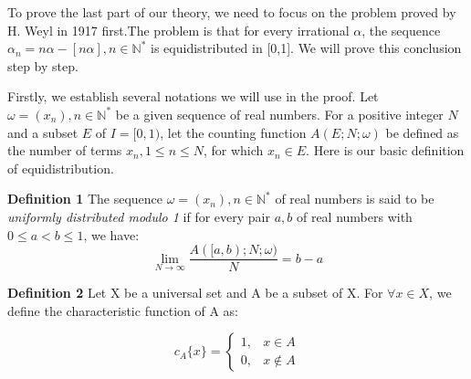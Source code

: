 \documentclass[12pt]{article}
\begin{document}
\par To prove the last part of our theory, we need to focus on the problem proved by H. Weyl in 1917 first.The problem is that for every irrational 
$\alpha$, the sequence $\alpha _n=n\alpha-[n\alpha], n\in \mathbb{N^*}$ is equidistributed in [0,1]. We will prove this conclusion step by step.
\par Firstly, we establish several notations we will use in the proof. Let $\omega=(x_n), n\in \mathbb{N^*}$ be a given sequence of real numbers. For a positive integer $N$ and a subset $E$ of $I=[0,1)$, let the counting function $A(E;N;\omega)$ be defined as the number of terms $x_n,1\le n\le N$, for which ${x_n}\in E$. Here is our basic definition of equidistribution.
\par {\textbf{Definition 1}} The sequence $\omega=(x_n), n\in \mathbb{N^*}$ of real numbers is said to be \emph{uniformly distributed modulo 1} if for every pair $a,b$ of real numbers with $0\le a<b\le 1$, we have:
\begin{equation*}
\lim_{N\to \infty}\frac{A([a,b);N;\omega)}{N}=b-a
\end{equation*}
\par {\textbf{ Definition 2}} Let X be a universal set and A be a subset of X. For $\forall x\in X$, we define the characteristic function of A as:

\begin{equation*}
c_A\{x\}=
\begin{cases}
1, &x\in A\\
0, &x\notin A
\end{cases}
\end{equation*}
\end{document}
